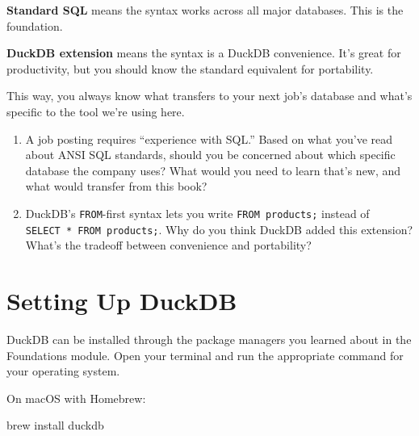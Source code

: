\documentclass[
  letterpaper,
  DIV=11,
  numbers=noendperiod]{scrreprt}
\newenvironment{Shaded}{\begin{snugshade}}{\end{snugshade}}
\newcommand{\ExtensionTok}[1]{\textcolor[rgb]{0.00,0.23,0.31}{#1}}
\newcommand{\NormalTok}[1]{\textcolor[rgb]{0.00,0.23,0.31}{#1}}
\begin{document}
\textbf{Standard SQL} means the syntax works across all major databases.
This is the foundation.

\textbf{DuckDB extension} means the syntax is a DuckDB convenience. It's
great for productivity, but you should know the standard equivalent for
portability.

This way, you always know what transfers to your next job's database and
what's specific to the tool we're using here.

\begin{tcolorbox}[enhanced jigsaw, opacitybacktitle=0.6, arc=.35mm, colback=white, bottomtitle=1mm, opacityback=0, toprule=.15mm, left=2mm, colbacktitle=quarto-callout-note-color!10!white, breakable, coltitle=black, toptitle=1mm, colframe=quarto-callout-note-color-frame, bottomrule=.15mm, titlerule=0mm, title=\textcolor{quarto-callout-note-color}{\faInfo}\hspace{0.5em}{Exercises}, rightrule=.15mm, leftrule=.75mm]

\begin{enumerate}
\def\labelenumi{\arabic{enumi}.}
\item
  A job posting requires ``experience with SQL.'' Based on what you've
  read about ANSI SQL standards, should you be concerned about which
  specific database the company uses? What would you need to learn
  that's new, and what would transfer from this book?
\item
  DuckDB's \texttt{FROM}-first syntax lets you write
  \texttt{FROM\ products;} instead of
  \texttt{SELECT\ *\ FROM\ products;}. Why do you think DuckDB added
  this extension? What's the tradeoff between convenience and
  portability?
\end{enumerate}

\end{tcolorbox}

\section{Setting Up DuckDB}\label{setting-up-duckdb}

DuckDB can be installed through the package managers you learned about
in the Foundations module. Open your terminal and run the appropriate
command for your operating system.

On macOS with Homebrew:

\begin{codelisting}

\caption{\texttt{terminal}}

\begin{Shaded}
\begin{Highlighting}[]
\ExtensionTok{brew}\NormalTok{ install duckdb}
\end{Highlighting}
\end{Shaded}

\end{codelisting}
\end{document}
